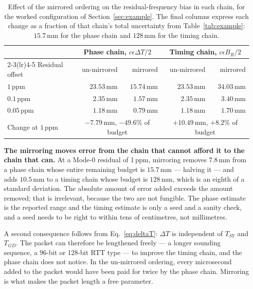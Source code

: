 \documentclass[11pt,a4paper]{article}
\newcommand{\Tsy}{T_{SY}}
\newcommand{\Tgd}{T_{GD}}
\begin{document}
\begin{table}[h]
\caption{Effect of the mirrored ordering on the residual-frequency bias in each chain, for the
worked configuration of Section~\ref{sec:example}. The final columns express each change as a
fraction of that chain's total uncertainty from Table~\ref{tab:example}: $15.7$\,mm for the phase
chain and $128$\,mm for the timing chain.}
\label{tab:mirror}
\centering\small
\begin{tabular}{@{}lrrrr@{}}
\toprule
 & \multicolumn{2}{c}{Phase chain, $c\epsilon\Delta T/2$} & \multicolumn{2}{c}{Timing chain, $c\epsilon B_R/2$} \\
\cmidrule(lr){2-3}\cmidrule(lr){4-5}
Residual offset & un-mirrored & mirrored & un-mirrored & mirrored \\
\midrule
$1$\,ppm     & $23.53$\,mm & $15.74$\,mm & $23.53$\,mm & $34.03$\,mm \\
$0.1$\,ppm   & $2.35$\,mm  & $1.57$\,mm  & $2.35$\,mm  & $3.40$\,mm  \\
$0.05$\,ppm  & $1.18$\,mm  & $0.79$\,mm  & $1.18$\,mm  & $1.70$\,mm  \\
\midrule
Change at $1$\,ppm & \multicolumn{2}{c}{$-7.79$\,mm, $-49.6\%$ of budget} & \multicolumn{2}{c}{$+10.49$\,mm, $+8.2\%$ of budget} \\
\bottomrule
\end{tabular}
\end{table}

\begin{callout}
\textbf{The mirroring moves error from the chain that cannot afford it to the chain that can.} At a
Mode-0 residual of 1\,ppm, mirroring removes $7.8$\,mm from a phase chain whose entire remaining
budget is $15.7$\,mm --- halving it --- and adds $10.5$\,mm to a timing chain whose budget is
$128$\,mm, which is an eighth of a standard deviation. The absolute amount of error added exceeds the
amount removed; that is irrelevant, because the two are not fungible. The phase estimate is the
reported range and the timing estimate is only a seed and a sanity check, and a seed needs to be
right to within tens of centimetres, not millimetres.
\end{callout}

A second consequence follows from Eq.~\eqref{eq:deltaT}: $\Delta T$ is independent of $\Tsy$ and
$\Tgd$. The packet can therefore be lengthened freely --- a longer sounding sequence, a 96-bit or
128-bit RTT type --- to improve the timing chain, and the phase chain does not notice. In the
un-mirrored ordering, every microsecond added to the packet would have been paid for twice by the
phase chain. Mirroring is what makes the packet length a free parameter.
\end{document}
